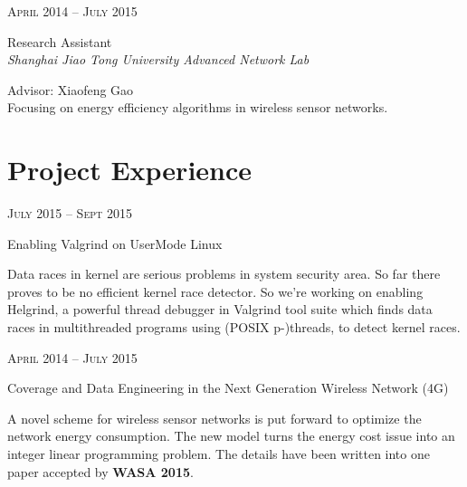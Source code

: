 \documentclass[10pt]{article} %
\begin{document}
{\begin{minipage}[t]{0.5\textwidth}
{\raggedleft\textsc{April 2014 -- July 2015}\par}

{\raggedright\large Research Assistant\\
\textit{Shanghai Jiao Tong University Advanced Network Lab}\\[5pt]}
Advisor: Xiaofeng Gao\\
\normalsize{Focusing on energy efficiency algorithms in wireless sensor networks.}\\


\section{Project Experience} 

{\raggedleft\textsc{July 2015 -- Sept 2015}\par}

{\raggedright\large Enabling Valgrind on UserMode Linux\\
[5pt]}

\normalsize{Data races in kernel are serious problems in system security area. So far there proves to be no efficient kernel race detector. So we're working on enabling Helgrind, a powerful thread debugger in Valgrind tool suite which finds data races in multithreaded programs using (POSIX p-)threads, to detect kernel races. }\\

{\raggedleft\textsc{April 2014 -- July 2015}\par}

{\raggedright\large Coverage and Data Engineering in the Next Generation Wireless Network (4G)\\
[5pt]}

\normalsize{A novel scheme for wireless sensor networks is put forward to optimize the network energy consumption. The new model turns the energy cost issue into an integer linear programming problem.  The details have been written into one paper accepted by \textbf{WASA 2015}.}\\


\end{minipage}}
\end{document}
